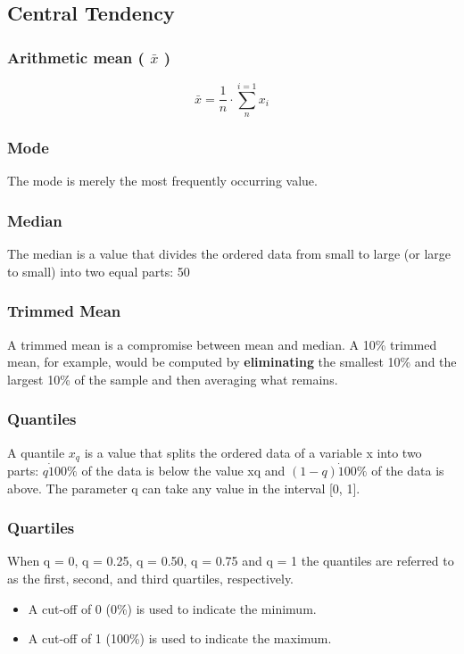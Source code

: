 \subsection{Central Tendency \cite{ism-1}}
\subsubsection{Arithmetic mean ( $\bar{x}$ ) \cite{ism-1}}\label{arithmetic_mean}
\vspace{0.2cm}
\[
    \bar{x} = \displaystyle\frac{1}{n} \cdot \sum_{n}^{i=1} x_i
\]

\subsubsection{Mode \cite{ism-1}}\label{mode}
The mode is merely the most frequently occurring value.

\subsubsection{Median \cite{ism-1}}\label{median}
The median is a value that divides the ordered data from small to large (or large to small) into two equal parts: 50%

\subsubsection{Trimmed Mean \cite{ism-1}}\label{Trimmed Mean}
A trimmed mean is a compromise between mean and median. A 10\% trimmed mean, for example, would be computed by \textbf{eliminating} the smallest 10\% and the largest 10\% of the sample and then averaging what remains.

\subsubsection{Quantiles \cite{ism-1}}\label{Quantiles}
A quantile $x_q$ is a value that splits the ordered data of a variable x into two parts: $q \dot 100\%$ of the data is below the value xq and $(1 - q) \dot 100\%$ of the data is above. The parameter q can take any value in the interval [0, 1].

\subsubsection{Quartiles \cite{ism-1}}\label{Quartiles}
When q = 0, q = 0.25, q = 0.50, q = 0.75 and q = 1 the quantiles are referred to as the first, second, and third quartiles, respectively.
\begin{itemize}
    \item A cut-off of 0 (0\%) is used to indicate the minimum.
    \item A cut-off of 1 (100\%) is used to indicate the maximum.
\end{itemize}

